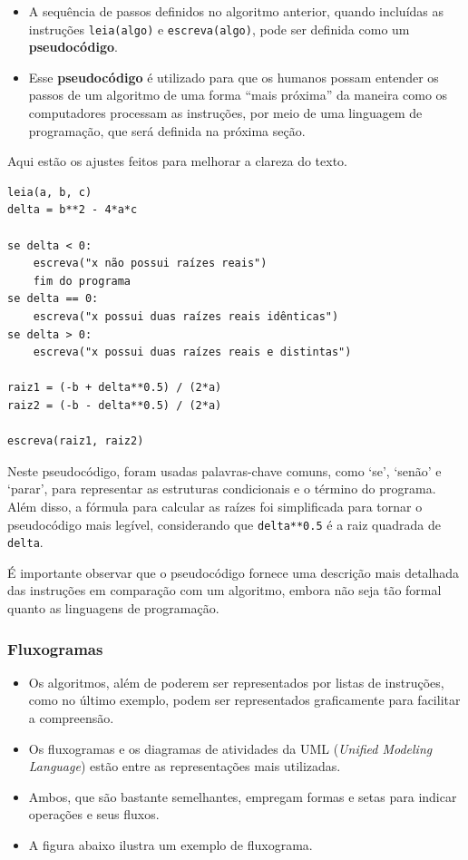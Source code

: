 \documentclass[12pt,a4paper]{article}
\begin{document}
    \begin{itemize}
\item
  A sequência de passos definidos no algoritmo anterior, quando
  incluídas as instruções \texttt{leia(algo)} e \texttt{escreva(algo)},
  pode ser definida como um \textbf{pseudocódigo}.
\item
  Esse \textbf{pseudocódigo} é utilizado para que os humanos possam
  entender os passos de um algoritmo de uma forma ``mais próxima'' da
  maneira como os computadores processam as instruções, por meio de uma
  linguagem de programação, que será definida na próxima seção.
\end{itemize}

Aqui estão os ajustes feitos para melhorar a clareza do texto.

    \begin{verbatim}
leia(a, b, c)
delta = b**2 - 4*a*c

se delta < 0:
    escreva("x não possui raízes reais")
    fim do programa
se delta == 0:
    escreva("x possui duas raízes reais idênticas")
se delta > 0:
    escreva("x possui duas raízes reais e distintas")

raiz1 = (-b + delta**0.5) / (2*a)
raiz2 = (-b - delta**0.5) / (2*a)

escreva(raiz1, raiz2)
\end{verbatim}

    Neste pseudocódigo, foram usadas palavras-chave comuns, como `se',
`senão' e `parar', para representar as estruturas condicionais e o
término do programa. Além disso, a fórmula para calcular as raízes foi
simplificada para tornar o pseudocódigo mais legível, considerando que
\texttt{delta**0.5} é a raiz quadrada de \texttt{delta}.

É importante observar que o pseudocódigo fornece uma descrição mais
detalhada das instruções em comparação com um algoritmo, embora não seja
tão formal quanto as linguagens de programação.

    \hypertarget{fluxogramas}{%
\subsubsection{Fluxogramas}\label{fluxogramas}}

    \begin{itemize}
\item
  Os algoritmos, além de poderem ser representados por listas de
  instruções, como no último exemplo, podem ser representados
  graficamente para facilitar a compreensão.
\item
  Os fluxogramas e os diagramas de atividades da UML (\emph{Unified
  Modeling Language}) estão entre as representações mais utilizadas.
\item
  Ambos, que são bastante semelhantes, empregam formas e setas para
  indicar operações e seus fluxos.
\item
  A figura abaixo ilustra um exemplo de fluxograma.
\end{itemize}
\end{document}
